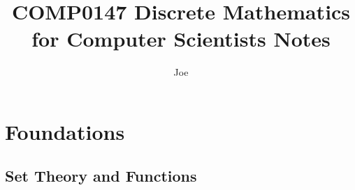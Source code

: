 \documentclass[a4paper, twoside]{book}
\title{COMP0147 Discrete Mathematics for Computer Scientists Notes}
\author{Joe}
\begin{document}
\maketitle
\dominitoc
\tableofcontents

\chapter{Foundations}
\minitoc

\section{Set Theory and Functions}
\end{document}
